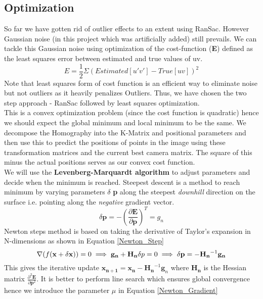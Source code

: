 \documentclass[titlepage]{article}
\begin{document}
\subsection{Optimization}
So far we have gotten rid of outlier effects to an extent using RanSac. However Gaussian noise (in this project which was artificially added) still prevails. We can tackle this Gaussian noise using optimization of the cost-function (\textbf{E}) defined as the least squares error between estimated and true values of uv.
\begin{equation}
E =\frac{1}{2} \Sigma(Estimated [u'v'] - True [u v])^2
\end{equation}
 Note that least squares form of cost function is an efficient way to eliminate noise but not outliers as it heavily penalizes Outliers. Thus, we have chosen the two step approach - RanSac followed by least squares optimization. \\
This is a convex optimization problem (since the cost function is quadratic) hence we should expect the global minimum and local minimum to be the same. We decompose the Homography into the K-Matrix and positional parameters and then use this to predict the positions of points in the image using these transformation matrices and the current best camera matrix. The square of this minus the actual positions serves as our convex cost function.\\
We will use the \textbf{Levenberg-Marquardt algorithm} to adjust parameters and decide when the minimum is reached. Steepest descent is a method to reach minimum by varying parameters $\delta$ \textbf{p} along the steepest \textit{downhill} direction on the surface i.e. pointing along the \textit{negative} gradient vector.
\begin{equation}
\label{steepest_descent}
\delta \textbf{p} = -(\frac{\partial \mathbf{E}}{\partial\mathbf{p}})^T = g_n
\end{equation}
%  
Newton steps method is based on taking the derivative of Taylor's expansion in N-dimensions as shown in Equation \ref{Newton_Step}   
\begin{equation}
  \label{Newton_Step}
  \nabla (f(\textbf{x}+\delta\textbf{x}))=0 \implies \mathbf{g_n} + \mathbf{H_n} \delta p = 0\\
  \implies \delta{\mathbf{p}}=-\mathbf{H_n}^{-1}\mathbf{g_n}
\end{equation}
This gives the iterative update $\mathbf{x_{n+1}}=\mathbf{x_n}-\mathbf{H_n}^{-1} \mathbf{g}_n$ where $\mathbf{H_n}$ is the Hessian matrix $\frac{\partial^2 \mathbf{E}}{\partial \mathbf{p}^2}$. It is better to perform line search which ensures global convergence hence we introduce the parameter $\mu$ in Equation \ref{Newton_Gradient}
\end{document}
